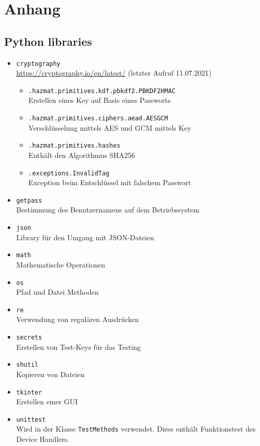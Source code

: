\documentclass[a4paper,titlepage]{article}
\newcommand{\ilc}[1]{\textcolor{codeColor}{\texttt{#1}}}
\begin{document}

\clearpage
\section*{Anhang}
    	\renewcommand\thesubsection{Anhang \arabic{subsection}} %
   	\renewcommand\thesubsubsection{\arabic{subsection}.\arabic{subsubsection}} %
   	\setcounter{figure}{0} 
   	  
	\subsection{Python libraries} \label{libraries} %
		\begin{itemize}
			\item \ilc{cryptography} \\
				\url{https://cryptography.io/en/latest/} (letzter Aufruf 11.07.2021)
				\begin{itemize}[label={}]
				\item \ilc{.hazmat.primitives.kdf.pbkdf2.PBKDF2HMAC} \\
					Erstellen eines Key auf Basis eines Passworts
				\item \ilc{.hazmat.primitives.ciphers.aead.AESGCM} \\
					Verschlüsselung mittels AES und GCM mittels Key
				\item \ilc{.hazmat.primitives.hashes}\\
					Enthält den Algorithmus SHA256
				\item \ilc{.exceptions.InvalidTag}\\
					Exception beim Entschlüssel mit falschem Passwort 
				\end{itemize}
			\item \ilc{getpass} \\
				Bestimmung des Benutzernamens auf dem Betriebssystem
			\item \ilc{json} \\
				Library für den Umgang mit JSON-Dateien
			\item \ilc{math} \\
				Mathematische Operationen
			\item \ilc{os} \\
				Pfad und Datei Methoden
			\item \ilc{re} \\
				Verwendung von regulären Ausdrücken	
			\item \ilc{secrets} \\
				Erstellen von Test-Keys für das Testing
			\item \ilc{shutil} \\
				Kopieren von Dateien
			\item \ilc{tkinter} \\
				Erstellen einer GUI				
			\item \ilc{unittest} \\
				Wird in der Klasse \ilc{TestMethods} verwendet. Diese enthält Funktionstest des Device Handlers.
		\end{itemize}
		
\end{document}
